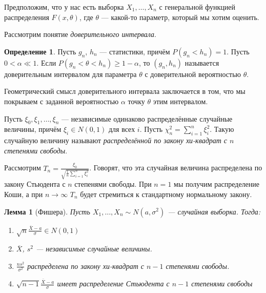 \documentclass[11pt,openany,a4paper]{scrartcl}
\theoremstyle{plain}
\newtheorem{lemma}[theorem]{Лемма}
\theoremstyle{definition}
\newtheorem{definition}[theorem]{Определение}
\newcommand{\ol}{\overline}
\begin{document}
Предположим, что у нас есть выборка $X_1, \ldots, X_n$ с генеральной функцией распределения
$F(x, \theta)$, где $\theta$ — какой-то параметр, который мы хотим оценить.

Рассмотрим понятие \emph{доверительного интервала}.
\begin{definition}
    Пусть $g_n$, $h_n$ — статистики, причём $P(g_n < h_n) = 1$. Пусть $0 < \alpha \ll 1$.
    Если $P(g_n < \theta < h_n) \geqslant 1 - \alpha$, то $(g_n, h_n)$ называется
    доверительным интервалом для параметра $\theta$ с доверительной вероятностью $\theta$.
\end{definition}

Геометрический смысл доверительного интервала заключается в том, что мы покрываем с заданной
вероятностью $\alpha$ точку $\theta$ этим интервалом.

Пусть $\xi_0, \xi_1, \ldots, \xi_n$ — независимые одинаково распределённые случайные 
величины, причём $\xi_i \in N(0, 1)$ для всех $i$.
Пусть $\chi_n^2 = \sum\limits_{i=1}^n \xi_i^2$. Такую случайную величину называют 
\emph{распределённой по закону хи-квадрат с $n$ степенями свободы}.

Рассмотрим $T_n = \frac{\xi_0}{\sqrt{\frac{1}{n}\sum\limits_{i=1}^n \xi_i^2}}$. Говорят, что
эта случайная величина распределена по закону Стьюдента с $n$ степенями свободы. При $n=1$
мы получим распределение Коши, а при $n \to \infty$ $T_n$ будет стремиться к стандартному
нормальному закону.

\begin{lemma}[Фишера]
    Пусть $X_1, \ldots, X_n \sim N(a, \sigma^2)$ — случайная выборка. Тогда:
    \begin{enumerate}
        \item $\sqrt{n}\frac{\ol X - a}{\sigma} \in N(0, 1)$
        \item $\ol X$, $s^2$ — независимые случайные величины.
        \item $\frac{ns^2}{\sigma^2}$ распределена по закону хи-квадрат с $n-1$ степенями 
        свободы.
        \item $\sqrt{n - 1}\frac{\ol X - a}{\sigma}$ имеет распределение Стьюдента с
        $n - 1$ степенями свободы
    \end{enumerate}
\end{lemma}
\end{document}
